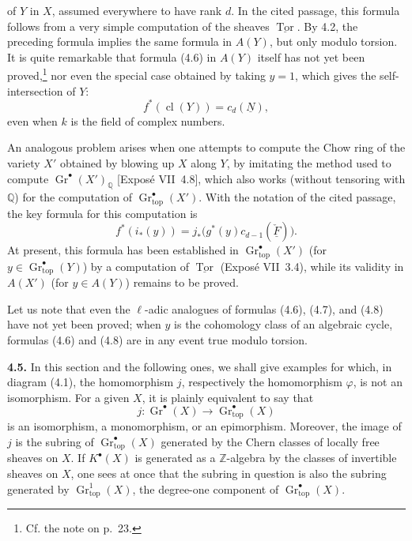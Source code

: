 \documentclass[11pt]{article}
\newcommand{\Q}{\mathbb Q}
\newcommand{\Z}{\mathbb Z}
\newcommand{\Gtop}{\operatorname{Gr}_{\mathrm{top}}}
\newcommand{\cl}{\operatorname{cl}}
\begin{document}
of $Y$ in $X$, assumed everywhere to have rank $d$. In the cited passage,
this formula follows from a very simple computation of the sheaves
$\underline{\operatorname{Tor}}$. By 4.2, the preceding formula implies the
same formula in $A(Y)$, but only modulo torsion. It is quite remarkable that
formula (4.6) in $A(Y)$ itself has not yet been proved,\footnote{Cf. the note
on p.~23.} nor even the special case obtained by taking $y=1$, which gives
the self-intersection of $Y$:
\begin{equation*}\tag{4.7}
 f^*(\cl(Y))=c_d(\underline{N}),
\end{equation*}
even when $k$ is the field of complex numbers.

An analogous problem arises when one attempts to compute the Chow ring of
the variety $X'$ obtained by blowing up $X$ along $Y$, by imitating the
method used to compute $\operatorname{Gr}^\bullet(X')_{\Q}$
[Exposé VII~4.8], which also works (without tensoring with $\Q$) for the
computation of $\Gtop^\bullet(X')$. With the notation of the cited passage,
the key formula for this computation is
\begin{equation*}\tag{4.8}
 f^*(i_*(y))
   =j_*\bigl(g^*(y)c_{d-1}(\check{\underline{F}})\bigr).
\end{equation*}
At present, this formula has been established in $\Gtop^\bullet(X')$ (for
$y\in\Gtop^\bullet(Y)$) by a computation of
$\underline{\operatorname{Tor}}$ (Exposé VII~3.4), while its validity in
$A(X')$ (for $y\in A(Y)$) remains to be proved.

Let us note that even the $\ell$-adic analogues of formulas (4.6), (4.7),
and (4.8) have not yet been proved; when $y$ is the cohomology class of an
algebraic cycle, formulas (4.6) and (4.8) are in any event true modulo
torsion.

\noindent\textbf{4.5.}
In this section and the following ones, we shall give examples for which,
in diagram (4.1), the homomorphism $j$, respectively the homomorphism
$\varphi$, is not an isomorphism. For a given $X$, it is plainly equivalent
to say that
\[
 j:\operatorname{Gr}^\bullet(X)\longrightarrow\Gtop^\bullet(X)
\]
is an isomorphism, a monomorphism, or an epimorphism. Moreover, the image of
$j$ is the subring of $\Gtop^\bullet(X)$ generated by the Chern classes of
locally free sheaves on $X$. If $K^\bullet(X)$ is generated as a
$\Z$-algebra by the classes of invertible sheaves on $X$, one sees at once
that the subring in question is also the subring generated by
$\Gtop^1(X)$, the degree-one component of $\Gtop^\bullet(X)$.
\end{document}
